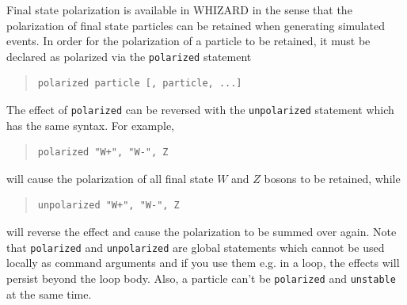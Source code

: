 \documentclass[12pt]{book}
\newcommand{\ttt}[1]{\texttt{#1}}
\begin{document}
Final state polarization is available in WHIZARD in the sense that the
polarization of final state particles can be retained when generating simulated
events. In order for the polarization of a particle to be retained, it must be
declared as polarized via the \ttt{polarized} statement
\begin{quote}
\begin{footnotesize}
\begin{verbatim}
polarized particle [, particle, ...]
\end{verbatim}
\end{footnotesize}
\end{quote}
The effect of \ttt{polarized} can be reversed with the \ttt{unpolarized}
statement which has the same syntax. For example,
\begin{quote}
\begin{footnotesize}
\begin{verbatim}
polarized "W+", "W-", Z
\end{verbatim}
\end{footnotesize}
\end{quote}
will cause the polarization of all final state $W$ and $Z$ bosons to be 
retained, while
\begin{quote}
\begin{footnotesize}
\begin{verbatim}
unpolarized "W+", "W-", Z
\end{verbatim}
\end{footnotesize}
\end{quote}
will reverse the effect and cause the polarization to be summed over again. Note
that \ttt{polarized} and \ttt{unpolarized} are global statements which cannot be
used locally as command arguments and if you use them e.g. in a loop, the
effects will persist beyond the loop body. Also, a particle can't be
\ttt{polarized} and \ttt{unstable} at the same time.
\end{document}

